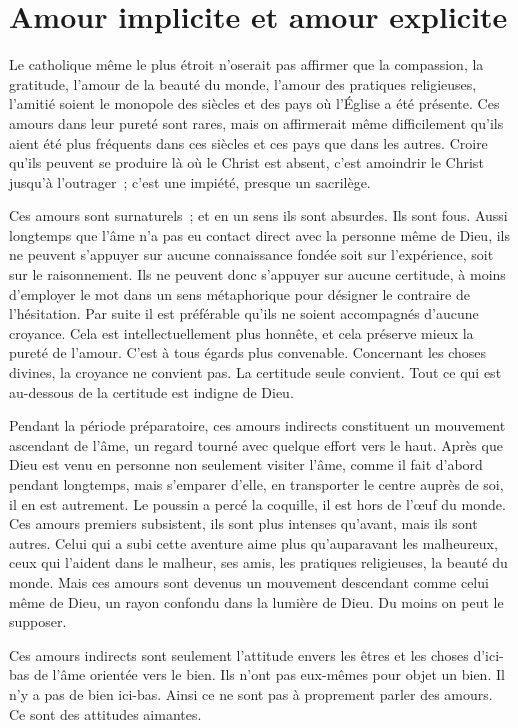\documentclass[french,twoside]{book} %
\begin{document}
\section[{Amour implicite et amour explicite}]{Amour implicite et amour explicite}
\noindent Le catholique même le plus étroit n'oserait pas affirmer que la compassion, la gratitude, l'amour de la beauté du monde, l'amour des pratiques religieuses, l'amitié soient le monopole des siècles et des pays où l'Église a été présente. Ces amours dans leur pureté sont rares, mais on affirmerait même difficilement qu'ils aient été plus fréquents dans ces siècles et ces pays que dans les autres. Croire qu'ils peuvent se produire là où le Christ est absent, c'est amoindrir le Christ jusqu'à l'outrager ; c'est une impiété, presque un sacrilège.\par
Ces amours sont surnaturels ; et en un sens ils sont absurdes. Ils sont fous. Aussi longtemps que l'âme n'a pas eu contact direct avec la personne même de Dieu, ils ne peuvent s'appuyer sur aucune connaissance fondée soit sur l'expérience, soit sur le raisonnement. Ils ne peuvent donc s'appuyer sur aucune certitude, à moins d'employer le mot dans un sens métaphorique pour désigner le contraire de l'hésitation. Par suite il est préférable qu'ils ne soient accompagnés d'aucune croyance. Cela est intellectuellement plus honnête, et cela préserve mieux la pureté de l'amour. C'est à tous égards plus convenable. Concernant les choses divines, la croyance ne convient pas. La certitude seule convient. Tout ce qui est au-dessous de la certitude est indigne de Dieu.\par
Pendant la période préparatoire, ces amours indirects constituent un mouvement ascendant de l'âme, un regard tourné avec quelque effort vers le haut. Après que Dieu est venu en personne non seulement visiter l'âme, comme il fait d'abord pendant longtemps, mais s'emparer d'elle, en transporter le centre auprès de soi, il en est autrement. Le poussin a percé la coquille, il est hors de l'œuf du monde. Ces amours premiers subsistent, ils sont plus intenses qu'avant, mais ils sont autres. Celui qui a subi cette aventure aime plus qu'auparavant les malheureux, ceux qui l'aident dans le malheur, ses amis, les pratiques religieuses, la beauté du monde. Mais ces amours sont devenus un mouvement descendant comme celui même de Dieu, un rayon confondu dans la lumière de Dieu. Du moins on peut le supposer.\par
Ces amours indirects sont seulement l'attitude envers les êtres et les choses d'ici-bas de l'âme orientée vers le bien. Ils n'ont pas eux-mêmes pour objet un bien. Il n'y a pas de bien ici-bas. Ainsi ce ne sont pas à proprement parler des amours. Ce sont des attitudes aimantes.\par
\end{document}
